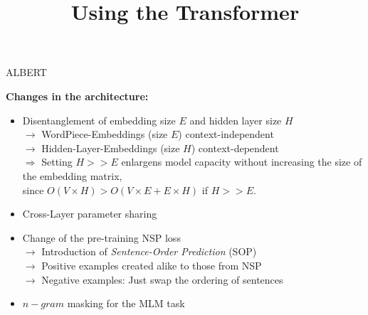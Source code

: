 



\newcommand{\titlefigure}{figure/sesamestreet.jpeg}
\newcommand{\learninggoals}{
\item Understand the improvements over BERT
\item Parameter sharing
\item Disentangled}

\title{Using the Transformer}
\date{}




\begin{frame}{ALBERT \href{https://arxiv.org/pdf/1909.11942.pdf}{}}

	\textbf{Changes in the architecture:}

	\begin{itemize}
		\item Disentanglement of embedding size $E$ and hidden layer size $H$\\
					$\rightarrow$ WordPiece-Embeddings (size $E$) context-independent\\
					$\rightarrow$ Hidden-Layer-Embeddings (size $H$) context-dependent\\
					$\Rightarrow$ Setting $H >> E$ enlargens model capacity without increasing the size of the embedding matrix,\\
					since $O(V \times H) > O(V \times E +  E \times H)$ if $H >> E$.
		\item Cross-Layer parameter sharing
		\item Change of the pre-training NSP loss\\
					$\rightarrow$ Introduction of \textit{Sentence-Order Prediction} (SOP)\\
					$\rightarrow$ Positive examples created alike to those from NSP\\
					$\rightarrow$ Negative examples: Just swap the ordering of sentences
		\item $n-gram$ masking for the MLM task
\end{itemize}
\end{frame}


